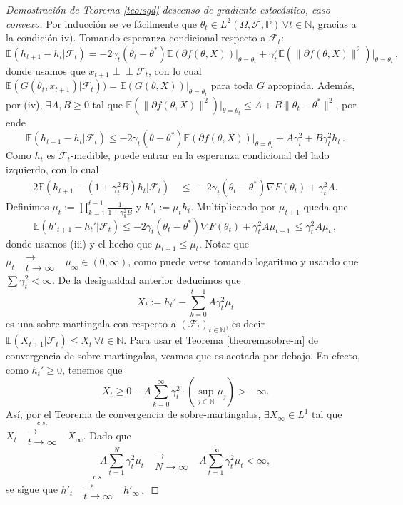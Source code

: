 \documentclass[letterpaper,11pt]{article} %
\theoremstyle{defbreak}
\theoremstyle{propbreak}
\theoremstyle{remark}
\theoremstyle{break}
\def\E{\mathbb{E}}
\def\P{\mathbb{P}}
\def\N{\mathbb{N}}
\newcommand{\indep}{\perp \!\!\! \perp}
\def\convt{\mbox{ }\substack{\longrightarrow \\ t\to\infty}\mbox{ }}
\def\convcst{\mbox{ }\overset{c.s.}{\substack{\longrightarrow \\t \to \infty}}\mbox{ }}
\begin{document}
\begin{proof}[Demostración de Teorema \ref{teo:sgd} descenso de gradiente estocástico, caso convexo]
Por inducci\'on se ve f\'acilmente  que  $\theta_t\in L^2(\Omega,\mathcal{F},\P)\,\forall t\in\N$, gracias a la condici\'on iv). Tomando esperanza condicional respecto a $\mathcal{F}_t$:
$$ \E(h_{t+1}-h_t|\mathcal{F}_t)  = -2\gamma_t(\theta_t-\theta^*)\E(\partial f(\theta,X))\big\vert_{\theta = \theta_t}  +\gamma_t^2\E(\|\partial f(\theta,X)\|^2)\big\vert_{\theta = \theta_t} \,,$$
donde usamos que $x_{t+1}\indep \mathcal{F}_t$, con lo cual $\E( G(\theta_t,x_{t+1})|\mathcal{F}_t)) = \E(G(\theta,X))\vert_{\theta = \theta_t}$ para toda $G$ apropiada. Además, por (iv),  $\exists A,B\geq 0$ tal que $\E(\|\partial f(\theta,X)\|^2)\big\vert_{\theta = \theta_t} \leq A+B\|\theta_t-\theta^*\|^2$, por ende
$$ \E(h_{t+1}-h_t|\mathcal{F}_t) \leq -2\gamma_t(\theta-\theta^*)\E(\partial f(\theta,X))\big\vert_{\theta=\theta_t} +A\gamma_t^2+B\gamma_t^2 h_t \,.$$
Como $h_t$ es $\mathcal{F}_t$-medible, puede entrar en la esperanza condicional del lado izquierdo, con lo cual 
\begin{alignat*}{2}
\E(h_{t+1}-(1+\gamma_t^2 B)h_t|\mathcal{F}_t) & \, \leq \, -2\gamma_t(\theta_t-\theta^*)\nabla F(\theta_t)+\gamma_t^2 A .
\end{alignat*}
 Definimos $\mu_t:=\displaystyle\prod^{t-1}_{k=1}\frac{1}{1+\gamma_k^2B}$ y $h'_t:=\mu_th_t$. Multiplicando por $\mu_{t+1}$ queda que
$$ \E(h'_{t+1}-h_t'|\mathcal{F}_t)\leq -2\gamma_t(\theta_t-\theta^*)\nabla F(\theta_t) + \gamma_t^2A\mu_{t+1}   \, \leq \gamma_t^2A\mu_{t} \,,   $$
donde usamos (iii) y el hecho que $\mu_{t+1}\leq \mu_t $. Notar que $\mu_t \convt \mu_\infty\in(0,\infty)$, como puede verse tomando logaritmo y usando que $\sum\gamma_t^2<\infty$. De la desigualdad anterior deducimos que
$$ X_t:=h_t'-\displaystyle\sum^{t-1}_{k=0}A\gamma_t^2\mu_t$$
es una sobre-martingala con respecto a $(\mathcal{F}_t)_{t\in\N}$, es decir $\E(X_{t+1}|\mathcal{F}_t)\leq X_t\,\forall t\in\N$. Para usar el Teorema \ref{theorem:sobre-m} de convergencia de  sobre-martingalas, veamos que es acotada por debajo. En efecto, como $h_t'\geq 0$, tenemos que 
$$ X_t \geq 0 - \displaystyle A\sum^\infty_{k=0}\gamma_t^2\cdot(\sup_{j\in\N}\mu_j)>-\infty.  $$
Así, por el Teorema de convergencia de  sobre-martingalas, 
 $\exists X_\infty\in L^1$ tal que $X_t\convcst X_\infty$. Dado que 
 $$A\sum^N_{t=1}\gamma_t^2\mu_t \mbox{ }\substack{\longrightarrow \\ N\to\infty}\mbox{ } A\sum^\infty_{t=1}\gamma_t^2\mu_t <\infty, $$ se sigue que
$ h'_t \mbox{ }\overset{c.s.}{\substack{\longrightarrow \\t \to \infty}}\mbox{ } h'_\infty \,,$

\end{proof}
\end{document}

